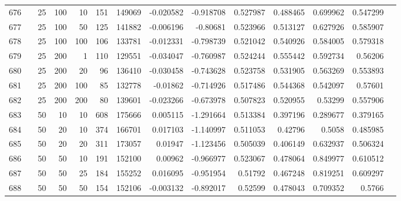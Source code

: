 \begin{longtable}{llrrrrrrrrrrrr}
		676 & &           25 &               100 &           10 &         151 &     149069 & -0.020582 & -0.918708 &  0.527987 &    0.488465 &       0.699962 &  0.547299 \\
		677 & &           25 &               100 &           50 &         125 &     141882 & -0.006196 &  -0.80681 &  0.523966 &    0.513127 &       0.627926 &  0.585907 \\
		678 & &           25 &               100 &          100 &         106 &     133781 & -0.012331 & -0.798739 &  0.521042 &    0.540926 &       0.584005 &  0.579318 \\
		679 & &           25 &               200 &            1 &         110 &     129551 & -0.034047 & -0.760987 &  0.524244 &    0.555442 &       0.592734 &   0.56206 \\
		680 & &           25 &               200 &           20 &          96 &     136410 & -0.030458 & -0.743628 &  0.523758 &    0.531905 &       0.563269 &  0.553893 \\
		681 & &           25 &               200 &          100 &          85 &     132778 &  -0.01862 & -0.714926 &  0.517486 &    0.544368 &       0.542097 &   0.57601 \\
		682 & &           25 &               200 &          200 &          80 &     139601 & -0.023266 & -0.673978 &  0.507823 &    0.520955 &        0.53299 &  0.557906 \\
		683 & &           50 &                10 &           10 &         608 &     175666 &  0.005115 & -1.291664 &  0.513384 &    0.397196 &       0.289677 &  0.379165 \\
		684 & &           50 &                20 &           10 &         374 &     166701 &  0.017103 & -1.140997 &  0.511053 &     0.42796 &         0.5058 &  0.485985 \\
		685 & &           50 &                20 &           20 &         311 &     173057 &   0.01947 & -1.123456 &  0.505039 &    0.406149 &       0.632937 &  0.506324 \\
		686 & &           50 &                50 &           10 &         191 &     152100 &   0.00962 & -0.966977 &  0.523067 &    0.478064 &       0.849977 &  0.610512 \\
		687 & &           50 &                50 &           25 &         184 &     155252 &  0.016095 & -0.951954 &   0.51792 &    0.467248 &       0.819251 &  0.609297 \\
		688 & &           50 &                50 &           50 &         154 &     152106 & -0.003132 & -0.892017 &   0.52599 &    0.478043 &       0.709352 &    0.5766 \\

\end{longtable}
